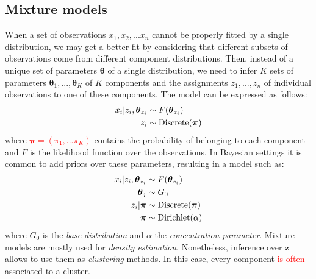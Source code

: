 \documentclass[smallextended]{svjour3}          %
\newcommand\alberto[1]{\textcolor{red}{#1}}
\begin{document}
\subsection{Mixture models}\label{sec:mixturemodels}
When a set of observations $x_1,x_2,...x_n$ cannot be properly fitted by a single distribution, we may get a better fit by considering that different subsets of observations come from different component distributions. Then, instead of a unique set of parameters $\boldsymbol{\theta}$ of a single distribution, we need to infer $K$ sets of parameters $\boldsymbol{\theta}_1,...,\boldsymbol{\theta}_K$ of $K$ components and the assignments $z_1,...,z_n$ of individual observations to one of these components. The model can be expressed as follows:
\begin{align}
x_i | z_i, \boldsymbol{\theta}_{z_i} &\sim F(\boldsymbol{\theta}_{z_i})\notag\\
z_i &\sim \text{Discrete}(\boldsymbol{\pi})
\end{align}
where \alberto{$\boldsymbol{\pi} = (\pi_1,...\pi_K)$} contains the probability of belonging to each component and $F$ is the likelihood function over the observations. In Bayesian settings it is common to add priors over these parameters, resulting in a model such as:
\begin{align}
x_i | z_i, \boldsymbol{\theta}_{z_i} &\sim F(\boldsymbol{\theta}_{z_i})\notag\\
\boldsymbol{\theta}_j &\sim G_0\notag\\
z_i | \boldsymbol{\pi} &\sim \text{Discrete}(\boldsymbol{\pi})\notag\\
\boldsymbol{\pi} &\sim \text{Dirichlet}(\alpha)
\end{align}
where $G_0$ is the \emph{base distribution} and $\alpha$ the \textit{concentration parameter}. Mixture models are mostly used for \textit{density estimation}. Nonetheless, inference over $\mathbf{z}$ allows to use them as \textit{clustering} methods. In this case, every component \alberto{is often} associated to a cluster.


\end{document}
